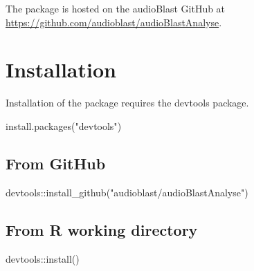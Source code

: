 \documentclass[
]{book}
\newenvironment{Shaded}{\begin{snugshade}}{\end{snugshade}}
\newcommand{\FunctionTok}[1]{\textcolor[rgb]{0.00,0.00,0.00}{#1}}
\newcommand{\NormalTok}[1]{#1}
\newcommand{\SpecialCharTok}[1]{\textcolor[rgb]{0.00,0.00,0.00}{#1}}
\newcommand{\StringTok}[1]{\textcolor[rgb]{0.31,0.60,0.02}{#1}}
\begin{document}
The package is hosted on the audioBlast GitHub at \url{https://github.com/audioblast/audioBlastAnalyse}.

\hypertarget{installation}{%
\section{Installation}\label{installation}}

Installation of the package requires the devtools package.

\begin{Shaded}
\begin{Highlighting}[]
\FunctionTok{install.packages}\NormalTok{(}\StringTok{"devtools"}\NormalTok{)}
\end{Highlighting}
\end{Shaded}

\hypertarget{from-github}{%
\subsection{From GitHub}\label{from-github}}

\begin{Shaded}
\begin{Highlighting}[]
\NormalTok{devtools}\SpecialCharTok{::}\FunctionTok{install\_github}\NormalTok{(}\StringTok{"audioblast/audioBlastAnalyse"}\NormalTok{)}
\end{Highlighting}
\end{Shaded}

\hypertarget{from-r-working-directory}{%
\subsection{From R working directory}\label{from-r-working-directory}}

\begin{Shaded}
\begin{Highlighting}[]
\NormalTok{devtools}\SpecialCharTok{::}\FunctionTok{install}\NormalTok{()}
\end{Highlighting}
\end{Shaded}


  
\end{document}
